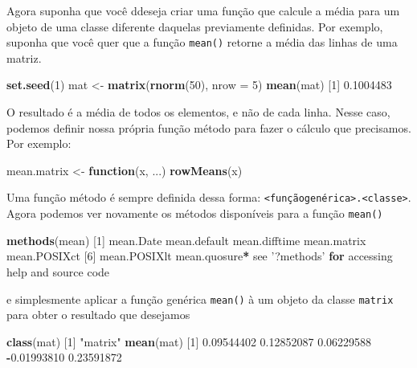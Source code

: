 \documentclass[10pt,a4paper]{book}
\newenvironment{Shaded}{\begin{snugshade}}{\end{snugshade}}
\newcommand{\KeywordTok}[1]{\textcolor[rgb]{0.13,0.29,0.53}{\textbf{#1}}}
\newcommand{\DataTypeTok}[1]{\textcolor[rgb]{0.13,0.29,0.53}{#1}}
\newcommand{\DecValTok}[1]{\textcolor[rgb]{0.00,0.00,0.81}{#1}}
\newcommand{\FloatTok}[1]{\textcolor[rgb]{0.00,0.00,0.81}{#1}}
\newcommand{\StringTok}[1]{\textcolor[rgb]{0.31,0.60,0.02}{#1}}
\newcommand{\ControlFlowTok}[1]{\textcolor[rgb]{0.13,0.29,0.53}{\textbf{#1}}}
\newcommand{\OperatorTok}[1]{\textcolor[rgb]{0.81,0.36,0.00}{\textbf{#1}}}
\newcommand{\NormalTok}[1]{#1}
\begin{document}
Agora suponha que você ddeseja criar uma função que calcule a média para
um objeto de uma classe diferente daquelas previamente definidas. Por
exemplo, suponha que você quer que a função \texttt{mean()} retorne a
média das linhas de uma matriz.

\begin{Shaded}
\begin{Highlighting}[]
\KeywordTok{set.seed}\NormalTok{(}\DecValTok{1}\NormalTok{)}
\NormalTok{mat <-}\StringTok{ }\KeywordTok{matrix}\NormalTok{(}\KeywordTok{rnorm}\NormalTok{(}\DecValTok{50}\NormalTok{), }\DataTypeTok{nrow =} \DecValTok{5}\NormalTok{)}
\KeywordTok{mean}\NormalTok{(mat)}
\NormalTok{[}\DecValTok{1}\NormalTok{] }\FloatTok{0.1004483}
\end{Highlighting}
\end{Shaded}

O resultado é a média de todos os elementos, e não de cada linha. Nesse
caso, podemos definir nossa própria função método para fazer o cálculo
que precisamos. Por exemplo:

\begin{Shaded}
\begin{Highlighting}[]
\NormalTok{mean.matrix <-}\StringTok{ }\ControlFlowTok{function}\NormalTok{(x, ...) }\KeywordTok{rowMeans}\NormalTok{(x)}
\end{Highlighting}
\end{Shaded}

Uma função método é sempre definida dessa forma:
\texttt{\textless{}funçãogenérica\textgreater{}.\textless{}classe\textgreater{}}.
Agora podemos ver novamente os métodos disponíveis para a função
\texttt{mean()}

\begin{Shaded}
\begin{Highlighting}[]
\KeywordTok{methods}\NormalTok{(mean)}
\NormalTok{[}\DecValTok{1}\NormalTok{] mean.Date     mean.default  mean.difftime mean.matrix   mean.POSIXct }
\NormalTok{[}\DecValTok{6}\NormalTok{] mean.POSIXlt  mean.quosure}\OperatorTok{*}
\NormalTok{see }\StringTok{'?methods'} \ControlFlowTok{for}\NormalTok{ accessing help and source code}
\end{Highlighting}
\end{Shaded}

e simplesmente aplicar a função genérica \texttt{mean()} à um objeto da
classe \texttt{matrix} para obter o resultado que desejamos

\begin{Shaded}
\begin{Highlighting}[]
\KeywordTok{class}\NormalTok{(mat)}
\NormalTok{[}\DecValTok{1}\NormalTok{] }\StringTok{"matrix"}
\KeywordTok{mean}\NormalTok{(mat)}
\NormalTok{[}\DecValTok{1}\NormalTok{]  }\FloatTok{0.09544402}  \FloatTok{0.12852087}  \FloatTok{0.06229588} \OperatorTok{-}\FloatTok{0.01993810}  \FloatTok{0.23591872}
\end{Highlighting}
\end{Shaded}
\end{document}
